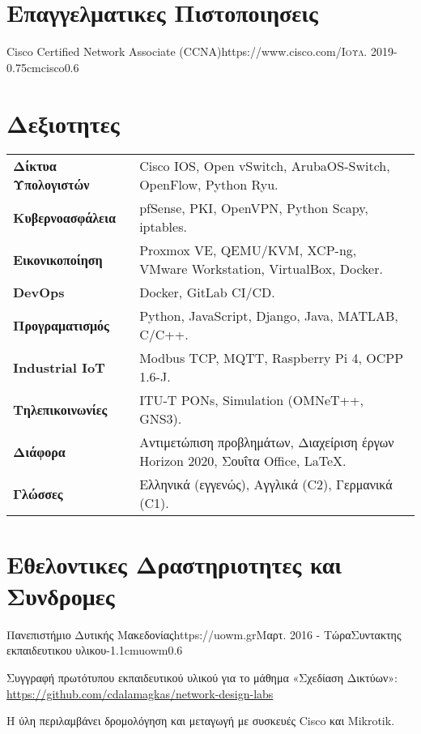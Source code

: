 \documentclass{mycv}
\begin{document}
	\vspace*{0.75cm}	

	
	\section{Επαγγελματικες Πιστοποιησεις}
	\begin{EntryDatedLogo}{Cisco Certified Network Associate (CCNA)}{https://www.cisco.com/}{\scshape{Ιουλ. 2019}}{}{-0.75cm}{cisco}{0.6}
	\end{EntryDatedLogo}
	\vspace{0.25cm}
	
	\section{Δεξιοτητες}
	\begin{tabular}{m{4.5cm} m{13cm}}\renewcommand{\arraystretch}{2}
		\textbf{Δίκτυα Υπολογιστών}   	& Cisco IOS, Open vSwitch, ArubaOS-Switch, OpenFlow, Python Ryu.\\
		\textbf{Κυβερνοασφάλεια}		& pfSense, PKI, OpenVPN, Python Scapy, iptables. \\
		\textbf{Εικονικοποίηση}			& Proxmox VE, QEMU/KVM, XCP-ng, VMware Workstation, VirtualBox, Docker.\\ 
		\textbf{DevOps}					& Docker, GitLab CI/CD. \\
		\textbf{Προγραματισμός}	    	& Python, JavaScript, Django, Java, MATLAB, C/C++. \\
		\textbf{Industrial IoT}			& Modbus TCP, MQTT, Raspberry Pi 4, OCPP 1.6-J.\\
		\textbf{Τηλεπικοινωνίες}   		& ITU-T PONs, Simulation (OMNeT++, GNS3). \\
		\textbf{Διάφορα}				& Αντιμετώπιση προβλημάτων, Διαχείριση έργων Horizon 2020, Σουΐτα Office, \LaTeX. \\
		\textbf{Γλώσσες} 				& Ελληνικά (εγγενώς), Αγγλικά (C2), Γερμανικά (C1).
	\end{tabular}

	\section{Εθελοντικες Δραστηριοτητες και Συνδρομες}
	\vspace*{0.125cm}	
	\begin{EntryDatedLogo}{Πανεπιστήμιο Δυτικής Μακεδονίας}{https://uowm.gr}{Μαρτ. 2016 - Τώρα}{Συντακτης εκπαιδευτικου υλικου}{-1.1cm}{uowm}{0.6}
		\begin{Itemize}
			\item Συγγραφή πρωτότυπου εκπαιδευτικού υλικού για το μάθημα «Σχεδίαση Δικτύων»: \url{https://github.com/cdalamagkas/network-design-labs}
			\item Η ύλη περιλαμβάνει δρομολόγηση και μεταγωγή με συσκευές Cisco και Mikrotik.
		\end{Itemize}
	\end{EntryDatedLogo}
	
\end{document}
